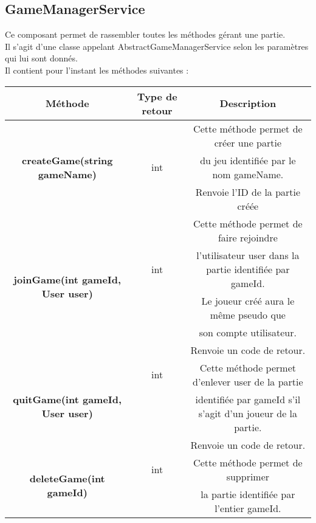 \documentclass{article}
\begin{document}
        \subsection{GameManagerService}
            Ce composant permet de rassembler toutes les méthodes gérant une partie.\\
            Il s'agit d'une classe appelant AbstractGameManagerService selon les paramètres qui lui sont donnés.\\
            Il contient pour l'instant les méthodes suivantes :\\
            \begin{center}
                \begin{tabular}{|| c | c | c ||}
                \hline 
                    Méthode & Type de retour & Description \\
                    \hline
                    \hline
                    \multirow{3}{*}{\textbf{createGame(string gameName)}} & & Cette méthode permet de créer une partie \\
                    & int & du jeu identifiée par le nom gameName.\\
                    & & Renvoie l'ID de la partie créée\\
                    \hline
                    \multirow{5}{*}{\textbf{joinGame(int gameId, User user)}} & & Cette méthode permet de faire rejoindre \\
                    & int & l'utilisateur user dans la partie identifiée par gameId. \\
                    & & Le joueur créé aura le même pseudo que \\
                    & & son compte utilisateur. \\
                    & & Renvoie un code de retour.\\
                    \hline
                    \multirow{3}{*}{\textbf{quitGame(int gameId, User user)}} & int & Cette méthode permet d'enlever user de la partie \\
                    & & identifiée par gameId s'il s'agit d'un joueur de la partie. \\
                    & &Renvoie un code de retour.\\
                    \hline
                    \multirow{3}{*}{\textbf{deleteGame(int gameId)}} & int & Cette méthode permet de supprimer \\
                    & & la partie identifiée par l'entier gameId.\\

\end{tabular}
\end{center}
\end{document}
